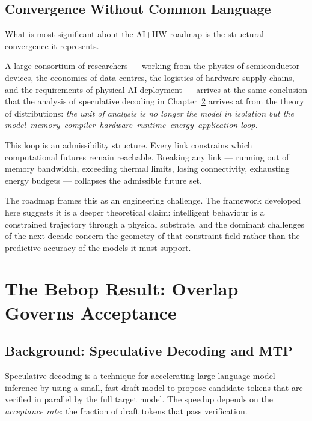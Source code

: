 \documentclass[11pt, a4paper, openany]{book}
\theoremstyle{plain}
\theoremstyle{definition}
\theoremstyle{remark}
\begin{document}
\section{Convergence Without Common Language}

What is most significant about the AI+HW roadmap is the structural
convergence it represents.

A large consortium of researchers --- working from the physics of semiconductor
devices, the economics of data centres, the logistics of hardware supply chains,
and the requirements of physical AI deployment --- arrives at the same conclusion
that the analysis of speculative decoding in Chapter~\ref{ch:bebop} arrives at
from the theory of distributions:
\emph{the unit of analysis is no longer the model in isolation but the
model--memory--compiler--hardware--runtime--energy--application loop.}

This loop is an admissibility structure.
Every link constrains which computational futures remain reachable.
Breaking any link --- running out of memory bandwidth, exceeding thermal
limits, losing connectivity, exhausting energy budgets --- collapses
the admissible future set.

The roadmap frames this as an engineering challenge.
The framework developed here suggests it is a deeper theoretical claim:
intelligent behaviour is a constrained trajectory through a physical
substrate, and the dominant challenges of the next decade concern the
geometry of that constraint field rather than the predictive accuracy of
the models it must support.

\chapter{The Bebop Result: Overlap Governs Acceptance}
\label{ch:bebop}

\section{Background: Speculative Decoding and MTP}

Speculative decoding is a technique for accelerating large language model
inference by using a small, fast draft model to propose candidate tokens
that are verified in parallel by the full target model.
The speedup depends on the \emph{acceptance rate}: the fraction of draft
tokens that pass verification.
\end{document}
